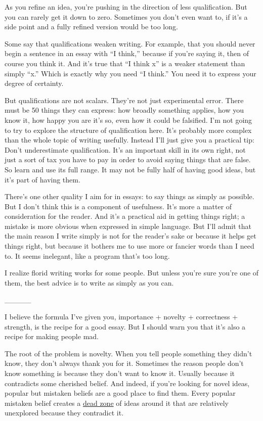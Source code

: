\documentclass[12pt]{book}
\begin{document}
As you refine an idea, you're pushing in the direction of less
qualification. But you can rarely get it down to zero. Sometimes you
don't even want to, if it's a side point and a fully refined version
would be too long.

Some say that qualifications weaken writing. For example, that you
should never begin a sentence in an essay with ``I think,'' because if
you're saying it, then of course you think it. And it's true that ``I
think x'' is a weaker statement than simply ``x.'' Which is exactly why
you need ``I think.'' You need it to express your degree of certainty.

But qualifications are not scalars. They're not just experimental error.
There must be 50 things they can express: how broadly something applies,
how you know it, how happy you are it's so, even how it could be
falsified. I'm not going to try to explore the structure of
qualification here. It's probably more complex than the whole topic of
writing usefully. Instead I'll just give you a practical tip: Don't
underestimate qualification. It's an important skill in its own right,
not just a sort of tax you have to pay in order to avoid saying things
that are false. So learn and use its full range. It may not be fully
half of having good ideas, but it's part of having them.

There's one other quality I aim for in essays: to say things as simply
as possible. But I don't think this is a component of usefulness. It's
more a matter of consideration for the reader. And it's a practical aid
in getting things right; a mistake is more obvious when expressed in
simple language. But I'll admit that the main reason I write simply is
not for the reader's sake or because it helps get things right, but
because it bothers me to use more or fancier words than I need to. It
seems inelegant, like a program that's too long.

I realize florid writing works for some people. But unless you're sure
you're one of them, the best advice is to write as simply as you can.

\_\_\_\_\_

I believe the formula I've given you, importance + novelty + correctness
+ strength, is the recipe for a good essay. But I should warn you that
it's also a recipe for making people mad.

The root of the problem is novelty. When you tell people something they
didn't know, they don't always thank you for it. Sometimes the reason
people don't know something is because they don't want to know it.
Usually because it contradicts some cherished belief. And indeed, if
you're looking for novel ideas, popular but mistaken beliefs are a good
place to find them. Every popular mistaken belief creates a
\href{nov.html}{dead zone} of ideas around it that are relatively
unexplored because they contradict it.
\end{document}

